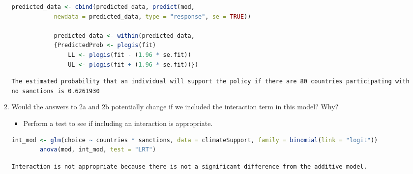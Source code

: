 \documentclass[12pt,letterpaper]{article}
\begin{document}
\begin{enumerate}
\begin{enumerate}
\begin{lstlisting}[language=R]
			predicted_data <- cbind(predicted_data, predict(mod, 
			newdata = predicted_data, type = "response", se = TRUE))
			
			predicted_data <- within(predicted_data,
			{PredictedProb <- plogis(fit)
				LL <- plogis(fit - (1.96 * se.fit))
				UL <- plogis(fit + (1.96 * se.fit))})\end{lstlisting}
		\texttt{The estimated probability that an individual will support  the policy if there are 80 countries participating with no sanctions is 0.6261930}
		\vspace{.25cm}
		\item
		Would the answers to 2a and 2b potentially change if we included the interaction term in this model? Why? 
		\begin{itemize}
			\item Perform a test to see if including an interaction is appropriate.
		\end{itemize}
	\begin{lstlisting}[language=R]
		int_mod <- glm(choice ~ countries * sanctions, data = climateSupport, family = binomial(link = "logit"))
		anova(mod, int_mod, test = "LRT")\end{lstlisting}
	\texttt{Interaction is not appropriate because there is not a significant difference from the additive model.}
	\end{enumerate}
	\end{enumerate}
\end{document}
